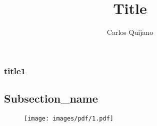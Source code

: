 \documentclass[handout]{beamer}
\begin{document}
\title{Title}
\author{Carlos Quijano}

\date{}%
\begin{frame}
\titlepage
\end{frame} 


\begin{frame}
\frametitle{title1}
\subsection{Subsection_name} 
\begin{figure}
\texttt{[image: images/pdf/1.pdf]} 
\end{figure}
\end{frame}
\end{document}
